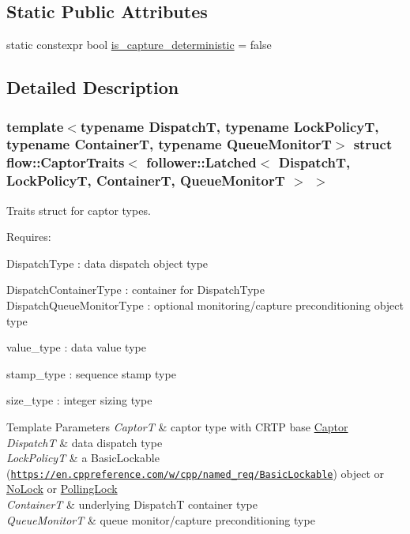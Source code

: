 \subsection*{Static Public Attributes}
\begin{DoxyCompactItemize}
\item 
static constexpr bool \hyperlink{structflow_1_1_captor_traits_3_01follower_1_1_latched_3_01_dispatch_t_00_01_lock_policy_t_00_01_7069ffe3c5f41ae454dc415b835f945a_a1658ae448bc61a7b26d895c405672e9b}{is\+\_\+capture\+\_\+deterministic} = false
\end{DoxyCompactItemize}


\subsection{Detailed Description}
\subsubsection*{template$<$typename DispatchT, typename Lock\+PolicyT, typename ContainerT, typename Queue\+MonitorT$>$\newline
struct flow\+::\+Captor\+Traits$<$ follower\+::\+Latched$<$ Dispatch\+T, Lock\+Policy\+T, Container\+T, Queue\+Monitor\+T $>$ $>$}

Traits struct for captor types. 

Requires\+:
\begin{DoxyItemize}
\item {\ttfamily Dispatch\+Type} \+: data dispatch object type
\item {\ttfamily Dispatch\+Container\+Type} \+: container for {\ttfamily Dispatch\+Type} {\ttfamily Dispatch\+Queue\+Monitor\+Type} \+: optional monitoring/capture preconditioning object type
\item {\ttfamily value\+\_\+type} \+: data value type
\item {\ttfamily stamp\+\_\+type} \+: sequence stamp type
\item {\ttfamily size\+\_\+type} \+: integer sizing type
\end{DoxyItemize}


\begin{DoxyTemplParams}{Template Parameters}
{\em CaptorT} & captor type with C\+R\+TP base {\ttfamily \hyperlink{classflow_1_1_captor}{Captor}}\\
\hline
{\em DispatchT} & data dispatch type \\
\hline
{\em Lock\+PolicyT} & a Basic\+Lockable (\href{https://en.cppreference.com/w/cpp/named_req/BasicLockable}{\tt https\+://en.\+cppreference.\+com/w/cpp/named\+\_\+req/\+Basic\+Lockable}) object or \hyperlink{structflow_1_1_no_lock}{No\+Lock} or \hyperlink{structflow_1_1_polling_lock}{Polling\+Lock} \\
\hline
{\em ContainerT} & underlying {\ttfamily DispatchT} container type \\
\hline
{\em Queue\+MonitorT} & queue monitor/capture preconditioning type \\
\hline
\end{DoxyTemplParams}



